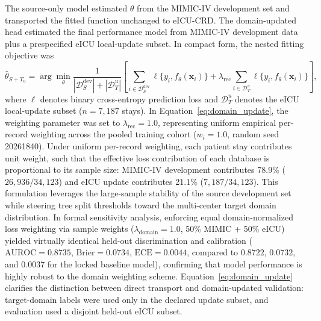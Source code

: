 \documentclass[utf8]{FrontiersinVancouver}
\newcommand{\re}[1]{#1}
\begin{document}
The source-only model estimated $\theta$ from the MIMIC-IV development set and transported the fitted function unchanged to eICU-CRD. The domain-updated head estimated the final performance model from MIMIC-IV development data plus a prespecified eICU local-update subset. In compact form, the nested fitting objective was
\begin{equation}
\hat{\theta}_{S+T_u}=
\arg\min_{\theta}
\frac{1}{|\mathcal{D}_{S}^{\mathrm{dev}}| + |\mathcal{D}_{T}^{u}|}
\left[
\sum_{i\in \mathcal{D}_{S}^{\mathrm{dev}}}\ell\{y_i,f_{\theta}(\mathbf{x}_i)\}
+
\lambda_{\mathrm{rec}}
\sum_{i\in \mathcal{D}_{T}^{u}}\ell\{y_i,f_{\theta}(\mathbf{x}_i)\}
\right],
\label{eq:domain_update}
\end{equation}
where $\ell$ denotes binary cross-entropy prediction loss and $\mathcal{D}_{T}^{u}$ denotes the eICU local-update subset ($n = 7{,}187$ stays). \re{In Equation~\ref{eq:domain_update}, the weighting parameter was set to $\lambda_{\mathrm{rec}} = 1.0$, representing uniform empirical per-record weighting across the pooled training cohort ($w_i = 1.0$, random seed 20261840). Under uniform per-record weighting, each patient stay contributes unit weight, such that the effective loss contribution of each database is proportional to its sample size: MIMIC-IV development contributes 78.9\% ($26{,}936 / 34{,}123$) and eICU update contributes 21.1\% ($7{,}187 / 34{,}123$). This formulation leverages the large-sample stability of the source development set while steering tree split thresholds toward the multi-center target domain distribution. In formal sensitivity analysis, enforcing equal domain-normalized loss weighting via sample weights ($\lambda_{\mathrm{domain}} = 1.0$, 50\% MIMIC + 50\% eICU) yielded virtually identical held-out discrimination and calibration ($\text{AUROC} = 0.8735$, $\text{Brier} = 0.0734$, $\text{ECE} = 0.0044$, compared to $0.8722$, $0.0732$, and $0.0037$ for the locked baseline model), confirming that model performance is highly robust to the domain weighting scheme.} Equation~\ref{eq:domain_update} clarifies the distinction between direct transport and domain-updated validation: target-domain labels were used only in the declared update subset, and evaluation used a disjoint held-out eICU subset.
\end{document}
